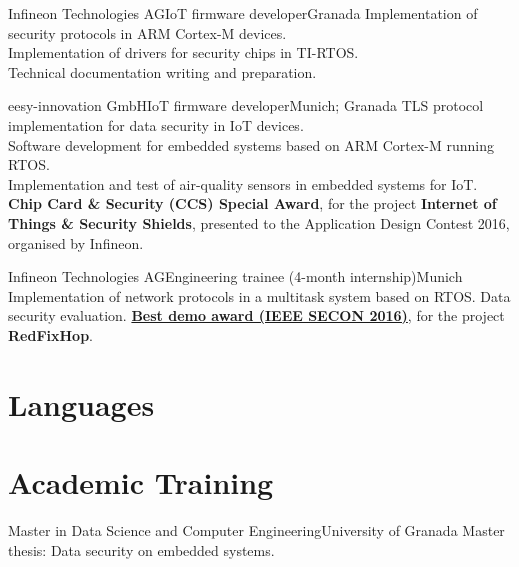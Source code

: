 \documentclass[11pt,a4paper,sans,spanish]{moderncv}
\begin{document}
{Infineon Technologies AG}{IoT firmware developer}{Granada}{}
{Implementation of security protocols in ARM Cortex-M devices.\\
Implementation of drivers for security chips in TI-RTOS.\\
Technical documentation writing and preparation.
}

{eesy-innovation GmbH}{IoT firmware developer}{Munich; Granada}{}
{TLS protocol implementation for data security in IoT devices.\\
Software development for embedded systems based on ARM Cortex-M running RTOS.\\
Implementation and test of air-quality sensors in embedded systems for IoT.\\
\textbf{Chip Card \& Security (CCS) Special Award}, for the project
\textbf{Internet of Things \& Security Shields}, presented to the Application
Design Contest 2016, organised by Infineon.
}

{Infineon Technologies AG}{Engineering trainee (4-month internship)}{Munich}{}
{
Implementation of network protocols in a multitask system based on RTOS.
Data security evaluation.
\href{http://secon2016.ieee-secon.org/content/demos-session}{\textbf{Best demo
award (IEEE SECON 2016)}}, for the project \textbf{RedFixHop}.
}


\section{Languages}






\section{Academic Training}

{Master in Data Science and Computer Engineering}{University of Granada}
{}{}{Master thesis: Data security on embedded systems.}
\end{document}
